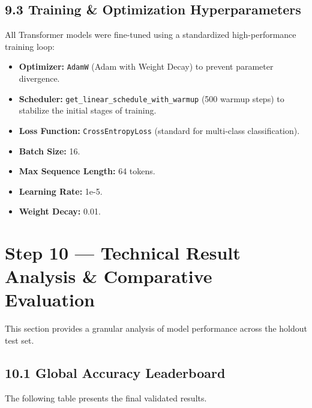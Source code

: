 \documentclass[
]{article}
\providecommand{\tightlist}{%
  \setlength{\itemsep}{0pt}\setlength{\parskip}{0pt}}
\begin{document}
\subsection{9.3 Training \& Optimization
Hyperparameters}\label{training-optimization-hyperparameters}

All Transformer models were fine-tuned using a standardized
high-performance training loop:

\begin{itemize}
\tightlist
\item
  \textbf{Optimizer:} \texttt{AdamW} (Adam with Weight Decay) to prevent
  parameter divergence.
\item
  \textbf{Scheduler:} \texttt{get\_linear\_schedule\_with\_warmup} (500
  warmup steps) to stabilize the initial stages of training.
\item
  \textbf{Loss Function:} \texttt{CrossEntropyLoss} (standard for
  multi-class classification).
\item
  \textbf{Batch Size:} 16.
\item
  \textbf{Max Sequence Length:} 64 tokens.
\item
  \textbf{Learning Rate:} 1e-5.
\item
  \textbf{Weight Decay:} 0.01.
\end{itemize}

\section{Step 10 --- Technical Result Analysis \& Comparative
Evaluation}\label{step-10-technical-result-analysis-comparative-evaluation}

This section provides a granular analysis of model performance across
the holdout test set.

\subsection{10.1 Global Accuracy
Leaderboard}\label{global-accuracy-leaderboard}

The following table presents the final validated results.
\end{document}
